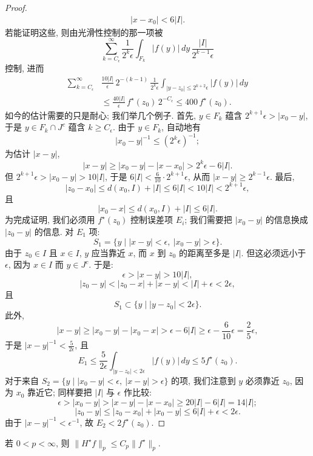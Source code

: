 \begin{proof}
\begin{gather*}
|x-x_{0}|<6|I|.
\end{gather*}
若能证明这些, 则由光滑性控制的那一项被
\[
\sum_{k=C_{\epsilon}}^{\infty}\frac{1}{2^{k}\epsilon}\int_{F_{k}}|f(y)|\,dy\,\frac{|I|}{2^{k-1}\epsilon}
\]
控制, 进而
\begin{align*}
\sum_{k=C_{\epsilon}}^{\infty}&\frac{10|I|}{\epsilon}\,2^{-(k-1)}\,\frac{1}{2^{k}\epsilon}\int_{|y-z_{0}|\leq 2^{k+2}\epsilon}|f(y)|\,dy \\
&\leq\frac{40|I|}{\epsilon}\,f^{\star}(z_{0})\,2^{-C_{\epsilon}}\leq 400\,f^{\star}(z_{0}).
\end{align*}
如今的估计需要的只是耐心; 我们举几个例子. 首先, $y\in F_k$ 蕴含 $2^{k+1}\epsilon>|x_0-y|$, 于是 $y\in F_k\cap J^{c}$ 蕴含 $k\geq C_{\epsilon}$. 由于 $y\in F_k$, 自动地有
\[
|x_{0}-y|^{-1}\leq(2^{k}\epsilon)^{-1};
\]
为估计 $|x-y|$,
\[
|x-y|\geq|x_{0}-y|-|x-x_{0}|>2^{k}\epsilon-6|I|.
\]
但 $2^{k+1}\epsilon>|x_0-y|>10|I|$, 于是 $6|I|<\frac{6}{10}\cdot 2^{k+1}\epsilon$, 从而 $|x-y|\geq 2^{k-1}\epsilon$. 最后,
\[
|z_{0}-x_{0}|\leq d(x_{0},I)+|I|\leq 6|I|<10|I|<2^{k+1}\epsilon,
\]
且
\[
|x_{0}-x|\leq d(x_{0},I)+|I|\leq 6|I|.
\]
为完成证明, 我们必须用 $f^{\star}(z_0)$ 控制误差项 $E_i$; 我们需要把 $|x_0-y|$ 的信息换成 $|z_0-y|$ 的信息. 对 $E_1$ 项:
\[
S_{1}=\{y \mid |x-y|<\epsilon,\ |x_{0}-y|>\epsilon\}.
\]
由于 $z_0\in I$ 且 $x\in I$, $y$ 应当靠近 $x$, 而 $x$ 到 $z_0$ 的距离至多是 $|I|$. 但这必须远小于 $\epsilon$, 因为 $x\in I$ 而 $y\in J^{c}$. 于是:
\[
\epsilon>|x-y|>10|I|,
\]
\[
|z_{0}-y|<|z_{0}-x|+|x-y|<|I|+\epsilon<2\epsilon,
\]
且
\[
S_{1}\subset\{y \mid |y-z_{0}|<2\epsilon\}.
\]
此外,
\[
|x-y|\geq|x_{0}-y|-|x_{0}-x|>\epsilon-6|I|\geq\epsilon-\frac{6}{10}\epsilon=\frac{2}{5}\epsilon,
\]
于是 $|x-y|^{-1}<\frac{5}{2\epsilon}$, 且
\[
E_{1}\leq\frac{5}{2\epsilon}\int_{|y-z_{0}|<2\epsilon}|f(y)|\,dy\leq 5f^{\star}(z_{0}).
\]
对于来自 $S_2=\{y \mid |x_0-y|<\epsilon,\ |x-y|>\epsilon\}$ 的项, 我们注意到 $y$ 必须靠近 $z_0$, 因为 $x_0$ 靠近它; 同样要把 $|I|$ 与 $\epsilon$ 作比较:
\[
\epsilon>|x_{0}-y|>|x-y|-|x-x_{0}|\geq 20|I|-6|I|=14|I|;
\]
\[
|z_{0}-y|\leq|z_{0}-x_{0}|+|x_{0}-y|\leq 6|I|+\epsilon<2\epsilon.
\]
由于 $|x-y|^{-1}<\epsilon^{-1}$, 故 $E_2<2f^{\star}(z_0)$.
\end{proof}

\begin{theorem}\label{thm:3.2}
若 $0<p<\infty$, 则 $\|H^{\star}f\|_p\leq C_p\|f^{\star}\|_p$.
\end{theorem}

